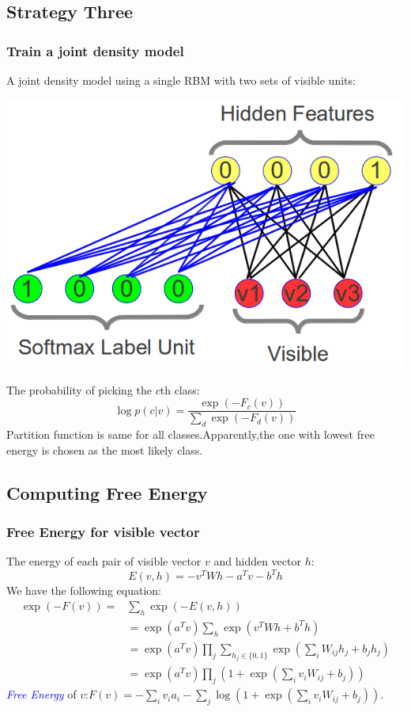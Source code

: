 \documentclass{beamer}
\begin{document}
\begin{CJK*}{UTF8}{gbsn}
\subsection{Strategy Three}
\begin{frame}\frametitle{Train a joint density model}
A joint density model using a single RBM with two sets of visible units:
\begin{center}
\includegraphics[scale=0.23]{images/pic3}
\end{center}
The probability of picking the $c$th class:
\begin{equation}
\log p(c|v)=\frac{\exp(-F_c(v))}{\sum_d\exp(-F_d(v))}
\end{equation}
Partition function is same for all classes.Apparently,the one with lowest free energy is chosen as the most likely class.
\end{frame}

\subsection{Computing Free Energy}
\begin{frame}\frametitle{Free Energy for visible vector}
The energy of each pair of visible vector $v$ and hidden vector $h$:
\begin{equation}
E(v,h)=-v^TWh-a^Tv-b^Th
\end{equation}
We have the following equation:
\begin{equation}
\begin{split}
\exp(-F(v))=&\sum_h\exp(-E(v,h))\\
&=\exp(a^Tv)\sum_h\exp(v^TWh+b^Th)\\
&=\exp(a^Tv)\prod_j\sum_{h_j\in\{0,1\}}\exp(\sum_iW_{ij}h_j+b_jh_j)\\
&=\exp(a^Tv)\prod_j(1+\exp(\sum_iv_iW_{ij}+b_j))
\end{split}
\end{equation}
\textcolor{blue}{\emph{Free Energy}} of $v$:$F(v)=-\sum_iv_ia_i-\sum_j\log(1+\exp(\sum_iv_iW_{ij}+b_j))$.
\end{frame}


\end{CJK*}
\end{document}
